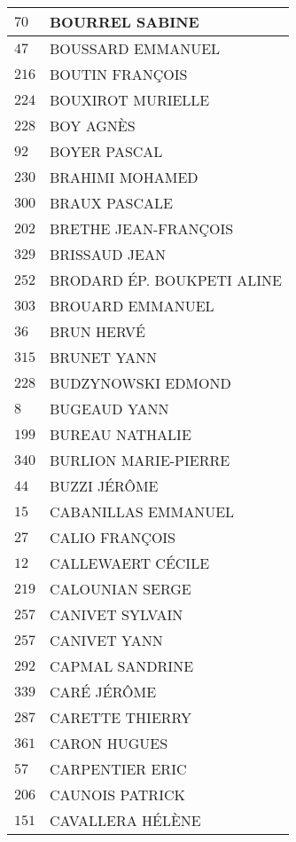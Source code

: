 \begin{xltabular}{\linewidth}{|l|X|}
    \hline
    $70$ & BOURREL SABINE \\
    \hline
    $47$ & BOUSSARD EMMANUEL \\
    \hline
    $216$ & BOUTIN FRANÇOIS \\
    \hline
    $224$ & BOUXIROT MURIELLE \\
    \hline
    $228$ & BOY AGNÈS \\
    \hline
    $92$ & BOYER PASCAL \\
    \hline
    $230$ & BRAHIMI MOHAMED \\
    \hline
    $300$ & BRAUX PASCALE \\
    \hline
    $202$ & BRETHE JEAN-FRANÇOIS \\
    \hline
    $329$ & BRISSAUD JEAN \\
    \hline
    $252$ & BRODARD ÉP. BOUKPETI ALINE \\
    \hline
    $303$ & BROUARD EMMANUEL \\
    \hline
    $36$ & BRUN HERVÉ \\
    \hline
    $315$ & BRUNET YANN \\
    \hline
    $228$ & BUDZYNOWSKI EDMOND \\
    \hline
    $8$ & BUGEAUD YANN \\
    \hline
    $199$ & BUREAU NATHALIE \\
    \hline
    $340$ & BURLION MARIE-PIERRE \\
    \hline
    $44$ & BUZZI JÉRÔME \\
    \hline
    $15$ & CABANILLAS EMMANUEL \\
    \hline
    $27$ & CALIO FRANÇOIS \\
    \hline
    $12$ & CALLEWAERT CÉCILE \\
    \hline
    $219$ & CALOUNIAN SERGE \\
    \hline
    $257$ & CANIVET SYLVAIN \\
    \hline
    $257$ & CANIVET YANN \\
    \hline
    $292$ & CAPMAL SANDRINE \\
    \hline
    $339$ & CARÉ JÉRÔME \\
    \hline
    $287$ & CARETTE THIERRY \\
    \hline
    $361$ & CARON HUGUES \\
    \hline
    $57$ & CARPENTIER ERIC \\
    \hline
    $206$ & CAUNOIS PATRICK \\
    \hline
    $151$ & CAVALLERA HÉLÈNE \\

\end{xltabular}

